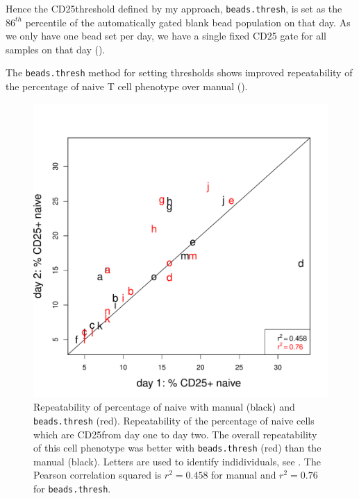 Hence the CD25\positive threshold defined by my approach, \texttt{beads.thresh}, is set as the $86^{th}$ percentile of the automatically gated blank bead population on that day.
As we only have one bead set per day, we have a single fixed CD25 gate for all samples on that day ().

The \texttt{beads.thresh} method for setting  thresholds  shows improved repeatability of the percentage of \positive naive T cell phenotype
over manual ().  



\begin{figure}[h]
\centering
\includegraphics[width=.5\textwidth]{figures/repeatability-cd25pos-naive.pdf}
{ Repeatability of percentage of naive \positive with manual (black) and \texttt{beads.thresh} (red). }
{
Repeatability of the percentage of naive cells which are CD25\positive from day one to day two.
The overall repeatability of this cell phenotype was better with \texttt{beads.thresh} (red)
than the manual (black).
Letters are used to identify indidividuals, see .
The Pearson correlation squared is $r^2=0.458$ for manual and $r^2=0.76$ for \texttt{beads.thresh}.
}
\end{figure}


